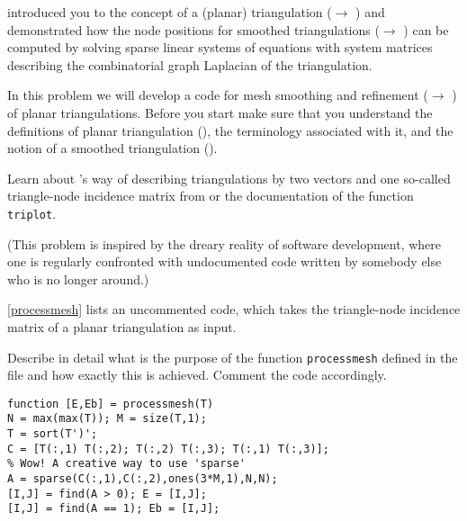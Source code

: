 \begin{problem}

 introduced you to the concept of a (planar) triangulation 
($\to$ ) and demonstrated how the node positions for smoothed
triangulations ($\to$ ) can be computed by solving sparse
linear systems of equations with system matrices describing the combinatorial
graph Laplacian of the triangulation. 

In this problem we will develop a \matlab{} code for mesh smoothing and refinement
($\to$ ) of planar triangulations. Before you start make sure
that you understand the definitions of planar triangulation (), the terminology associated with it, and the notion of a smoothed triangulation ().

\begin{subproblem}[1]\label{triag:sp0}
  Learn about \matlab{}'s way of describing triangulations by two vectors and one
  so-called triangle-node incidence matrix from  or the
  documentation of the \matlab{} function \texttt{triplot}.
\end{subproblem}

\begin{subproblem}[2]\label{triag:sp1}
  (This problem is inspired by the dreary reality of software development, where
  one is regularly confronted with undocumented code written by somebody else who
  is no longer around.)

  \cref{processmesh} lists an uncommented \Matlab{} code, which takes the
  triangle-node incidence matrix of a planar triangulation as input.
  
  Describe in detail what is the purpose of the function \verb|processmesh|
  defined in the file and how exactly this is achieved. Comment the code
  accordingly.
 
 \begin{lstlisting}[style=mcode,label={processmesh},caption={An undocumented
     \matlab{} function extracting some information from a triangulation 
     given in \matlab{} format}]
function [E,Eb] = processmesh(T)
N = max(max(T)); M = size(T,1);
T = sort(T')';
C = [T(:,1) T(:,2); T(:,2) T(:,3); T(:,1) T(:,3)];
% Wow! A creative way to use 'sparse'
A = sparse(C(:,1),C(:,2),ones(3*M,1),N,N);
[I,J] = find(A > 0); E = [I,J];
[I,J] = find(A == 1); Eb = [I,J];
\end{lstlisting}


\end{subproblem}
\end{problem}
